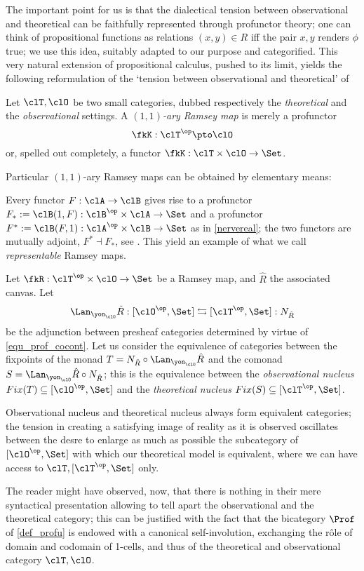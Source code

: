 The important point for us is that the dialectical tension between observational and theoretical can be faithfully represented through profunctor theory; one can think of propositional functions as relations $(x,y)\in R$ iff the pair $x,y$ renders $\phi$ true; we use this idea, suitably adapted to our purpose and categorified. This very natural extension of propositional calculus, pushed to its limit, yields the following reformulation of the `tension between observational and theoretical' of \cite{u,v,w}
\begin{definition}\label{11_ramsey}
	Let $\clT,\clO$ be two small categories, dubbed respectively the \emph{theoretical} and the \emph{observational} settings. A \emph{$(1,1)$-ary Ramsey map} is merely a profunctor
	\[\fkK : \clT^\op \pto \clO\]
	or, spelled out completely, a functor $\fkK : \clT\times \clO \to \Set$.
\end{definition}
Particular $(1,1)$-ary Ramsey maps can be obtained by elementary means:
\begin{example}
	Every functor $F : \clA \to \clB$ gives rise to a profunctor $F_* := \clB(1,F) : \clB^\op\times \clA\to\Set$ and a profunctor $F^* := \clB(F,1) : \clA^\op\times\clB \to \Set$ as in \autoref{nervereal}; the two functors are mutually adjoint, $F^*\dashv F_*$, see \cite{}. This yield an example of what we call \emph{representable} Ramsey maps. 
\end{example}
\begin{definition}
	Let $\fkR : \clT^\op\times \clO \to\Set$ be a Ramsey map, and $\hat R$ the associated canvas. Let
	\[ \Lan_{\yon_\clO}\hat R : [\clO^\op,\Set] \leftrightarrows [\clT^\op,\Set] : N_{\hat R} \]
	be the adjunction between presheaf categories determined by virtue of \autoref{equ_prof_cocont}. Let us consider the equivalence of categories between the fixpoints of the monad $T = N_{\hat R}\circ\Lan_{\yon_\clO}\hat R$ and the comonad $S=\Lan_{\yon_\clO}\hat R\circ N_{\hat R}$; this is the equivalence between the \emph{observational nucleus} $Fix(T)\subseteq [\clO^\op,\Set]$ and the \emph{theoretical nucleus} $Fix(S)\subseteq [\clT^\op,\Set]$.
\end{definition}
\begin{remark}
	Observational nucleus and theoretical nucleus always form equivalent categories; the tension in creating a satisfying image of reality as it is observed oscillates between the desre to enlarge as much as possible the subcategory of $[\clO^\op,\Set]$ with which our theoretical model is equivalent, where we can have access to $\clT, [\clT^\op, \Set]$ only.
\end{remark}
The reader might have observed, now, that there is nothing in their mere syntactical presentation allowing to tell apart the observational and the theoretical category; this can be justified with the fact that the bicategory $\Prof$ of \autoref{def_profu} is endowed with a canonical self-involution, exchanging the r\^ole of domain and codomain of 1-cells, and thus of the theoretical and observational category $\clT,\clO$.



